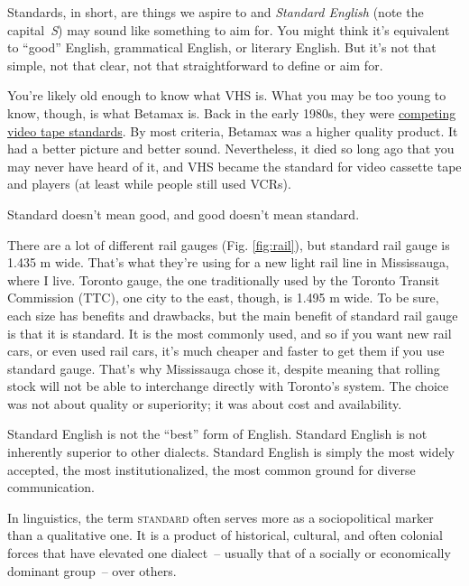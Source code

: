 Standards, in short, are things we aspire to and \textit{Standard English} (note the capital~\textit{S}) may sound like something to aim for. You might think it's equivalent to ``good'' English, grammatical English, or literary English. But it's not that simple, not that clear, not that straightforward to define or aim for.

You're likely old enough to know what VHS is. What you may be too young to know, though, is what Betamax is. Back in the early 1980s, they were \href{https://en.wikipedia.org/wiki/Videotape_format_war}{competing video tape standards}. By most criteria, Betamax was a higher quality product. It had a better picture and better sound. Nevertheless, it died so long ago that you may never have heard of it, and VHS became the standard for video cassette tape and players (at least while people still used VCRs).

Standard doesn't mean good, and good doesn't mean standard.

There are a lot of different rail gauges (Fig. \ref{fig:rail}), but standard rail gauge is 1.435 m wide. That's what they're using for a new light rail line in Mississauga, where I live. Toronto gauge, the one traditionally used by the Toronto Transit Commission (TTC), one city to the east, though, is 1.495 m wide. To be sure, each size has benefits and drawbacks, but the main benefit of standard rail gauge is that it is standard. It is the most commonly used, and so if you want new rail cars, or even used rail cars, it's much cheaper and faster to get them if you use standard gauge. That's why Mississauga chose it, despite meaning that rolling stock will not be able to interchange directly with Toronto's system. The choice was not about quality or superiority; it was about cost and availability. 

Standard English is not the ``best'' form of English. Standard English is not inherently superior to other dialects. Standard English is simply the most widely accepted, the most institutionalized, the most common ground for diverse communication.

In linguistics, the term \textsc{standard} often serves more as a sociopolitical marker than a qualitative one. It is a product of historical, cultural, and often colonial forces that have elevated one dialect~-- usually that of a socially or economically dominant group~-- over others. 

